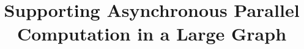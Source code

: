 \documentclass{sig-alternate}
\begin{document}
\title{Supporting Asynchronous Parallel Computation in a Large Graph}

%
%
%
%
%
\end{document}
